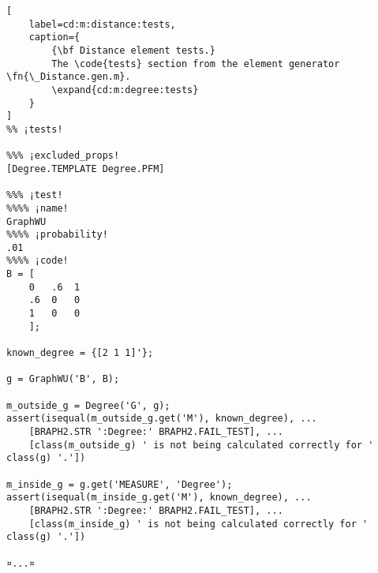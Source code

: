 \documentclass{tufte-handout}
\begin{document}
\begin{lstlisting}[
	label=cd:m:distance:tests,
	caption={
		{\bf Distance element tests.}
		The \code{tests} section from the element generator \fn{\_Distance.gen.m}.
		\expand{cd:m:degree:tests}
	}
]
%% ¡tests!

%%% ¡excluded_props!
[Degree.TEMPLATE Degree.PFM] 

%%% ¡test!
%%%% ¡name!
GraphWU
%%%% ¡probability!
.01
%%%% ¡code!
B = [
    0   .6  1
    .6  0   0
    1   0   0
    ];

known_degree = {[2 1 1]'};

g = GraphWU('B', B);

m_outside_g = Degree('G', g);
assert(isequal(m_outside_g.get('M'), known_degree), ...
    [BRAPH2.STR ':Degree:' BRAPH2.FAIL_TEST], ...
    [class(m_outside_g) ' is not being calculated correctly for ' class(g) '.'])

m_inside_g = g.get('MEASURE', 'Degree');
assert(isequal(m_inside_g.get('M'), known_degree), ...
    [BRAPH2.STR ':Degree:' BRAPH2.FAIL_TEST], ...
    [class(m_inside_g) ' is not being calculated correctly for ' class(g) '.'])

¤...¤
\end{lstlisting}

%
%
\end{document}
